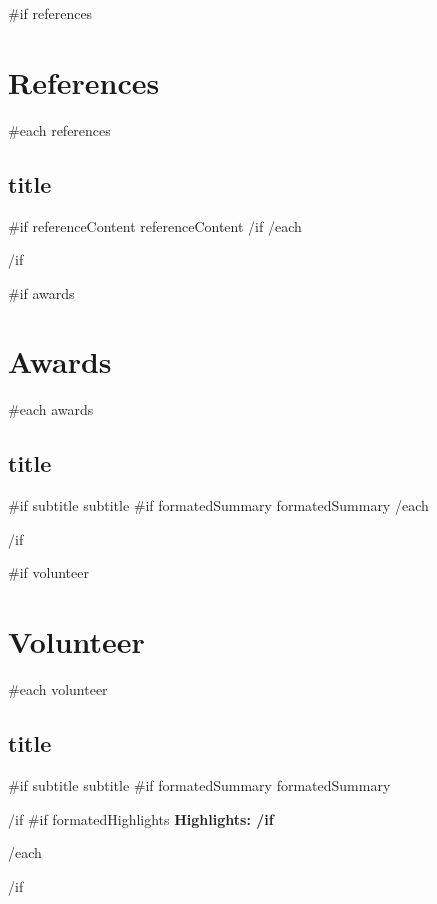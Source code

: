 \documentclass{article}
\begin{document}
{{#if references}}
\section*{References} {
  {{#each references}}
    \subsection*{ {{ title }} } {
      {{#if referenceContent}}{{ referenceContent }}{{/if}}\ignorespaces
    }
  {{/each}}
}{{/if}}\ignorespaces

{{#if awards}}\section*{Awards}{
  {{#each awards}}
    \subsection*{ {{ title }} } {
      {{#if subtitle}}{{ subtitle }} \ignorespaces
      {{#if formatedSummary}}{{ formatedSummary }}\ignorespaces
    }
  {{/each}}
}{{/if}}\ignorespaces

{{#if volunteer}}\section*{Volunteer} {
  {{#each volunteer}}
    \subsection*{ {{ title }} } {
      {{#if subtitle}}{{ subtitle }} \ignorespaces
      {{#if formatedSummary}}
        {{ formatedSummary }}
        \par
      {{/if}}\ignorespaces
      {{#if formatedHighlights}}
        \bfseries Highlights: \newline
      {{/if}}\ignorespaces
    }
  {{/each}}
}{{/if}}\ignorespaces
\end{document}
